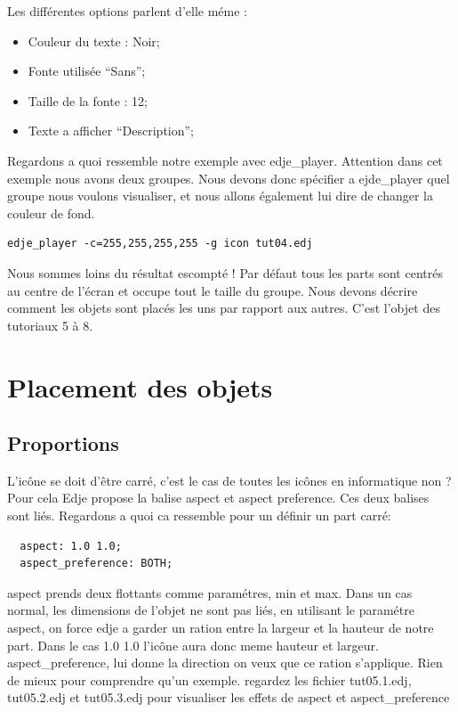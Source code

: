 \documentclass[a4paper]{efr}
\begin{document}
Les différentes options parlent d'elle méme : 
\begin{itemize}
\item Couleur du texte : Noir;
\item Fonte utilisée ``Sans'';
\item Taille de la fonte : 12;
\item Texte a afficher ``Description'';
\end{itemize}

Regardons a quoi ressemble notre exemple avec edje\_player. Attention dans cet
exemple nous avons deux groupes. Nous devons donc spécifier a ejde\_player quel
groupe nous voulons visualiser, et nous allons également lui dire de changer la
couleur de fond.

\begin{lstlisting}
edje_player -c=255,255,255,255 -g icon tut04.edj
\end{lstlisting}

Nous sommes loins du résultat escompté ! Par défaut tous les parts sont
centrés au centre de l'écran et occupe tout le taille du groupe. Nous devons
décrire comment les objets sont placés les uns par rapport aux autres.
C'est l'objet des tutoriaux 5 à 8.


\section{Placement des objets}
\subsection{Proportions}

L'icône se doit d'être carré, c'est le cas de toutes les icônes en informatique
non ?  Pour cela Edje propose la balise aspect et aspect preference. Ces deux
balises sont liés. Regardons a quoi ca ressemble pour un définir un part carré:
\begin{lstlisting}
  aspect: 1.0 1.0;
  aspect_preference: BOTH;
\end{lstlisting}

aspect prends deux flottants comme paramétres, min et max. Dans un cas normal,
les dimensions de l'objet ne sont pas liés, en utilisant le paramétre aspect,
on force edje a garder un ration entre la largeur et la hauteur de notre part.
Dans le cas 1.0 1.0 l'icône aura donc meme hauteur et largeur.
aspect\_preference, lui donne la direction on veux que ce ration s'applique.
Rien de mieux pour comprendre qu'un exemple. regardez les fichier tut05.1.edj,
tut05.2.edj et tut05.3.edj pour visualiser les effets de aspect et
aspect\_preference
\end{document}
